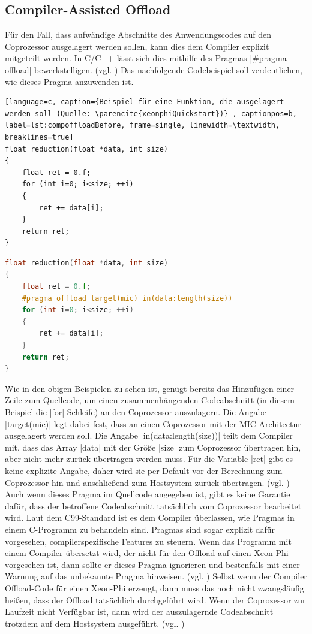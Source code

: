 \documentclass[../main.tex]{subfiles}
\begin{document}
\subsection{Compiler-Assisted Offload}
Für den Fall, dass aufwändige Abschnitte des Anwendungscodes auf den Coprozessor ausgelagert werden sollen, kann dies dem Compiler explizit mitgeteilt werden. In C/C++ lässt sich dies mithilfe des Pragmas |#pragma offload| bewerkstelligen. (vgl. \cite{xeonphiQuickstart}) Das nachfolgende Codebeispiel soll verdeutlichen, wie dieses Pragma anzuwenden ist. 
\begin{lstlisting}[language=c, caption={Beispiel für eine Funktion, die ausgelagert werden soll (Quelle: \parencite{xeonphiQuickstart})} , captionpos=b, label=lst:compoffloadBefore, frame=single, linewidth=\textwidth, breaklines=true]
float reduction(float *data, int size) 
{ 
	float ret = 0.f; 
	for (int i=0; i<size; ++i) 
	{
		ret += data[i]; 
	} 
	return ret; 
}
\end{lstlisting}
\begin{lstlisting}[language=c, caption={Beispielfunktion mit pragma zur Auslagerung(Quelle: \parencite{xeonphiQuickstart})}, captionpos=b, label=lst:compoffloadAfter, frame=single, linewidth=\textwidth, breaklines=true]
float reduction(float *data, int size) 
{ 
	float ret = 0.f; 
	#pragma offload target(mic) in(data:length(size))
	for (int i=0; i<size; ++i) 
	{
		ret += data[i]; 
	} 
	return ret; 
}
\end{lstlisting}
Wie in den obigen Beispielen zu sehen ist, genügt bereits das Hinzufügen einer Zeile zum Quellcode, um einen zusammenhängenden Codeabschnitt (in diesem Beispiel die |for|-Schleife) an den Coprozessor auszulagern. Die Angabe |target(mic)| legt dabei fest, dass an einen Coprozessor mit der MIC-Architectur ausgelagert werden soll. Die Angabe |in(data:length(size))| teilt dem Compiler mit, dass das Array |data| mit der Größe |size| zum Coprozessor übertragen hin, aber nicht mehr zurück übertragen werden muss. Für die Variable |ret| gibt es keine explizite Angabe, daher wird sie per Default vor der Berechnung zum Coprozessor hin und anschließend zum Hostsystem zurück übertragen. (vgl. \cite{xeonphiQuickstart})
Auch wenn dieses Pragma im Quellcode angegeben ist, gibt es keine Garantie dafür, dass der betroffene Codeabschnitt tatsächlich vom Coprozessor bearbeitet wird. Laut dem C99-Standard ist es dem Compiler überlassen, wie Pragmas in einem C-Programm zu behandeln sind. Pragmas sind sogar explizit dafür vorgesehen, compilerspezifische Features zu steuern. Wenn das Programm mit einem Compiler übersetzt wird, der nicht für den Offload auf einen Xeon Phi vorgesehen ist, dann sollte er dieses Pragma ignorieren und bestenfalls mit einer Warnung auf das unbekannte Pragma hinweisen. (vgl. \cite{gccDokuPragmas}) Selbst wenn der Compiler Offload-Code für einen Xeon-Phi erzeugt, dann muss das noch nicht zwangsläufig heißen, dass der Offload tatsächlich durchgeführt wird. Wenn der Coprozessor zur Laufzeit nicht Verfügbar ist, dann wird der auszulagernde Codeabschnitt trotzdem auf dem Hostsystem ausgeführt. (vgl. \cite{xeonphiQuickstart})
\end{document}
